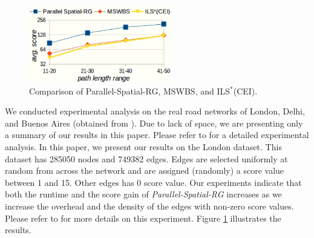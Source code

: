 \begin{figure}%
\centering
\includegraphics[width=6.2cm]{candidate-london.png}
\caption{Comparison of Parallel-Spatial-RG, MSWBS, and ILS$^*$(CEI).}
\label{fig_algo_compare}
\end{figure}
We conducted experimental analysis on the real road networks of London, Delhi, and Buenos Aires (obtained from \cite{Alireza_Karduni}). Due to lack of space, we are presenting only a summary of our results in this paper. Please refer to \cite{Venkata_M_V_Gunturi} for a detailed experimental analysis. In this paper, we present our results on the London dataset. This dataset has 285050 nodes and 749382 edges. Edges are selected uniformly at random from across the network and are assigned (randomly) a score value between 1 and 15. Other edges has 0 score value. Our experiments indicate that both the runtime and the score gain of \textit{Parallel-Spatial-RG} increases as we increase the overhead and the density of the edges with non-zero score values. Please refer to \cite{Venkata_M_V_Gunturi} for more details on this experiment. Figure \ref{fig_algo_compare} illustrates the results.